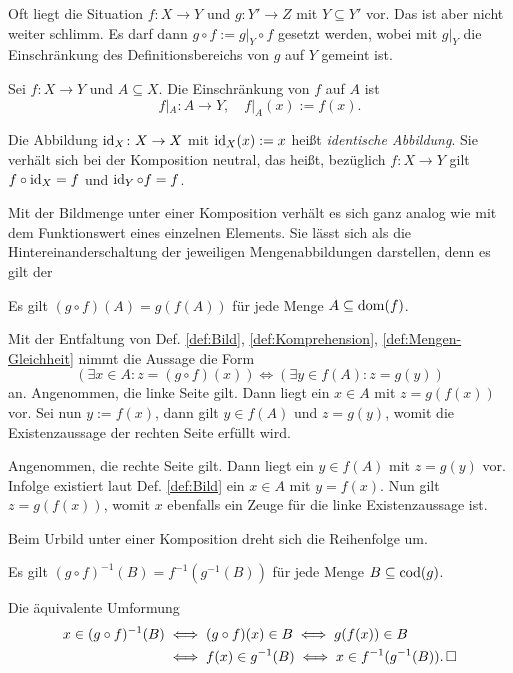 \noindent
Oft liegt die Situation $f\colon X\to Y$ und $g\colon Y'\to Z$
mit $Y\subseteq Y'$ vor. Das ist aber nicht weiter schlimm. Es
darf dann $g\circ f := g|_Y\circ f$ gesetzt werden, wobei mit $g|_Y$ die
Einschränkung des Definitionsbereichs von $g$ auf $Y$ gemeint ist.

\begin{Definition}[Einschränkung]\newlinefirst
Sei $f\colon X\to Y$ und $A\subseteq X$. Die Einschränkung von
$f$ auf $A$ ist%
\[f|_A\colon A\to Y,\quad f|_A(x):=f(x).\]
\end{Definition}

\noindent
Die Abbildung $\operatorname{id}_X\colon X\to X$ mit $\operatorname{id}_X(x):=x$ heißt
\emph{identische Abbildung}. Sie verhält
sich bei der Komposition neutral, das heißt, bezüglich
$f\colon X\to Y$ gilt $f\circ\operatorname{id}_X = f$ und $\operatorname{id}_Y\circ f=f$.

Mit der Bildmenge unter einer Komposition verhält es sich ganz analog
wie mit dem Funktionswert eines einzelnen Elements. Sie lässt sich
als die Hintereinanderschaltung der jeweiligen Mengenabbildungen
darstellen, denn es gilt der

\begin{Satz}\label{Bild-unter-Komposition}
Es gilt $(g\circ f)(A) = g(f(A))$ für jede Menge $A\subseteq\operatorname{dom}(f)$.
\end{Satz}
\begin{Beweis}
Mit der Entfaltung von Def. \ref{def:Bild}, \ref{def:Komprehension},
\ref{def:Mengen-Gleichheit} nimmt die Aussage die Form
\[(\exists x\in A\colon z=(g\circ f)(x)) \iff
(\exists y\in f(A)\colon z = g(y))\]
an. Angenommen, die linke Seite gilt. Dann liegt ein $x\in A$ mit
$z=g(f(x))$ vor. Sei nun $y:=f(x)$, dann gilt $y\in f(A)$ und $z=g(y)$,
womit die Existenzaussage der rechten Seite erfüllt wird.

Angenommen, die rechte Seite gilt. Dann liegt ein $y\in f(A)$ mit
$z=g(y)$ vor. Infolge existiert laut Def. \ref{def:Bild} ein $x\in A$ mit
$y=f(x)$. Nun gilt $z=g(f(x))$, womit $x$ ebenfalls ein Zeuge
für die linke Existenzaussage ist.\,\qedsymbol
\end{Beweis}

\noindent
Beim Urbild unter einer Komposition dreht sich die Reihenfolge um.
\begin{Satz}
Es gilt $(g\circ f)^{-1}(B) = f^{-1}(g^{-1}(B))$ für jede Menge
$B\subseteq\operatorname{cod}(g)$.
\end{Satz}
\begin{Beweis}
Die äquivalente Umformung
\begin{align*}
x\in (g\circ f)^{-1}(B) &\iff (g\circ f)(x)\in B \iff g(f(x))\in B\\
&\iff f(x)\in g^{-1}(B) \iff x\in f^{-1}(g^{-1}(B)).\,\Box
\end{align*}
\end{Beweis}

